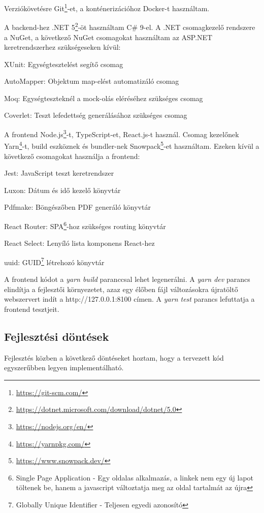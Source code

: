 Verziókövetésre Git\footnote{\url{https://git-scm.com/}}-et, a konténerizációhoz Docker-t használtam.

A backend-hez .NET 5\footnote{\url{https://dotnet.microsoft.com/download/dotnet/5.0}}-öt használtam C\# 9-el. A .NET csomagkezelő rendszere a NuGet, a következő NuGet csomagokat használtam az ASP.NET keretrendszerhez szükségeseken kívül:

\begin{compactitem}
	\item XUnit: Egységtesztelést segítő csomag
	\item AutoMapper: Objektum map-elést automatizáló csomag
	\item Moq: Egységteszteknél a mock-olás eléréséhez szükséges csomag
	\item Coverlet: Teszt lefedettség generálásához szükséges csomag
\end{compactitem}

A frontend Node.js\footnote{\url{https://nodejs.org/en/}}-t, TypeScript-et, React.js-t használ. Csomag kezelőnek Yarn\footnote{\url{https://yarnpkg.com/}}-t, build eszköznek és bundler-nek Snowpack\footnote{\url{https://www.snowpack.dev/}}-et használtam. Ezeken kívül a következő csomagokat használja a frontend:

\begin{compactitem}
	\item Jest: JavaScript teszt keretrendszer
	\item Luxon: Dátum és idő kezelő könyvtár
	\item Pdfmake: Böngészőben PDF generáló könyvtár
	\item React Router: SPA\footnote{Single Page Application - Egy oldalas alkalmazás, a linkek nem egy új lapot töltenek be, hanem a javascript változtatja meg az oldal tartalmát az újra}-hoz szükséges routing könyvtár
	\item React Select: Lenyíló lista komponens React-hez
	\item uuid: GUID\footnote{Globally Unique Identifier - Teljesen egyedi azonosító} létrehozó könyvtár
\end{compactitem}

A frontend kódot a \textit{yarn build} paranccsal lehet legenerálni. A \textit{yarn dev} parancs elindítja a fejlesztői környezetet, azaz egy élőben fájl változásokra újratöltő webszervert indít a http://127.0.0.1:8100 címen. A \textit{yarn test} parancs lefuttatja a frontend tesztjeit.


\subsection{Fejlesztési döntések}
Fejlesztés közben a következő döntéseket hoztam, hogy a tervezett kód egyszerűbben legyen implementálható.

